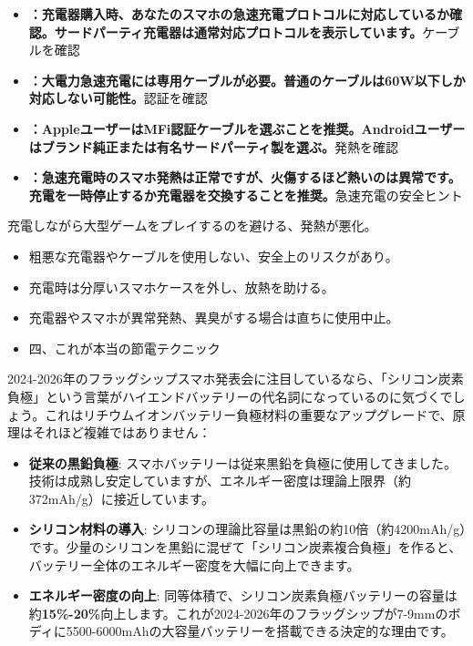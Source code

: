 
\begin{itemize}
  \item \textbf{：充電器購入時、あなたのスマホの急速充電プロトコルに対応しているか確認。サードパーティ充電器は通常対応プロトコルを表示しています。}ケーブルを確認
  \item \textbf{：大電力急速充電には専用ケーブルが必要。普通のケーブルは60W以下しか対応しない可能性。}認証を確認
  \item \textbf{：AppleユーザーはMFi認証ケーブルを選ぶことを推奨。Androidユーザーはブランド純正または有名サードパーティ製を選ぶ。}発熱を確認
  \item \textbf{：急速充電時のスマホ発熱は正常ですが、火傷するほど熱いのは異常です。充電を一時停止するか充電器を交換することを推奨。}急速充電の安全ヒント
\end{itemize}

\begin{tcbwarn}{充電しながら大型ゲームをプレイするのを避ける、発熱が悪化。}
\begin{itemize}
  \item 粗悪な充電器やケーブルを使用しない、安全上のリスクがあり。
  \item 充電時は分厚いスマホケースを外し、放熱を助ける。
  \item 充電器やスマホが異常発熱、異臭がする場合は直ちに使用中止。
  \item 四、これが本当の節電テクニック
\end{itemize}

\end{tcbwarn}


2024-2026年のフラッグシップスマホ発表会に注目しているなら、「シリコン炭素負極」という言葉がハイエンドバッテリーの代名詞になっているのに気づくでしょう。これはリチウムイオンバッテリー負極材料の重要なアップグレードで、原理はそれほど複雑ではありません：

\begin{itemize}
  \item \textbf{従来の黒鉛負極}: スマホバッテリーは従来黒鉛を負極に使用してきました。技術は成熟し安定していますが、エネルギー密度は理論上限界（約372mAh/g）に接近しています。
  \item \textbf{シリコン材料の導入}: シリコンの理論比容量は黒鉛の約10倍（約4200mAh/g）です。少量のシリコンを黒鉛に混ぜて「シリコン炭素複合負極」を作ると、バッテリー全体のエネルギー密度を大幅に向上できます。
  \item \textbf{エネルギー密度の向上}: 同等体積で、シリコン炭素負極バッテリーの容量は約\textbf{15\%-20\%}向上します。これが2024-2026年のフラッグシップが7-9mmのボディに5500-6000mAhの大容量バッテリーを搭載できる決定的な理由です。
\end{itemize}


